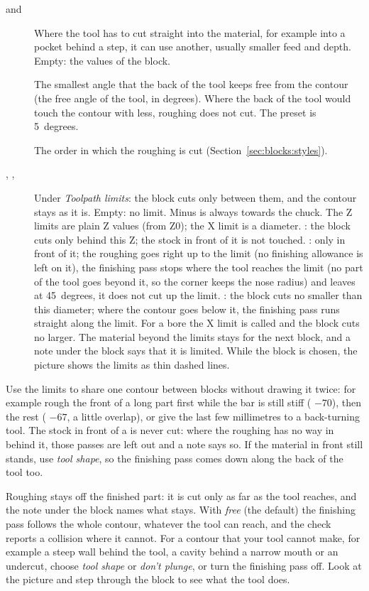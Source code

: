 \begin{description}
\item[ and ] Where the tool has to cut straight into the material, for example into a pocket behind a step, it can use another, usually smaller feed and depth. Empty: the values of the block.
\item[] The smallest angle that the back of the tool keeps free from the contour (the free angle of the tool, in degrees). Where the back of the tool would touch the contour with less, roughing does not cut. The preset is 5~degrees.
\item[] The order in which the roughing is cut (Section~\ref{sec:blocks:styles}).
\item[, , ] Under \emph{Toolpath limits}: the block cuts only between them, and the contour stays as it is. Empty: no limit. Minus is always towards the chuck. The Z limits are plain Z values (from Z0); the X limit is a diameter. : the block cuts only behind this Z; the stock in front of it is not touched. : only in front of it; the roughing goes right up to the limit (no finishing allowance is left on it), the finishing pass stops where the tool reaches the limit (no part of the tool goes beyond it, so the corner keeps the nose radius) and leaves at 45~degrees, it does not cut up the limit. : the block cuts no smaller than this diameter; where the contour goes below it, the finishing pass runs straight along the limit. For a bore the X limit is called  and the block cuts no larger. The material beyond the limits stays for the next block, and a note under the block says that it is limited. While the block is chosen, the picture shows the limits as thin dashed lines.
\end{description}

Use the limits to share one contour between blocks without drawing it twice: for example rough the front of a long part first while the bar is still stiff ( $-70$), then the rest ( $-67$, a little overlap), or give the last few millimetres to a back-turning tool. The stock in front of a  is never cut: where the roughing has no way in behind it, those passes are left out and a note says so. If the material in front still stands, use  \emph{tool shape}, so the finishing pass comes down along the back of the tool too.

\begin{notebox}
Roughing stays off the finished part: it is cut only as far as the tool reaches, and the note under the block names what stays. With  \emph{free} (the default) the finishing pass follows the whole contour, whatever the tool can reach, and the check reports a collision where it cannot. For a contour that your tool cannot make, for example a steep wall behind the tool, a cavity behind a narrow mouth or an undercut, choose \emph{tool shape} or \emph{don't plunge}, or turn the finishing pass off. Look at the picture and step through the block to see what the tool does.
\end{notebox}

